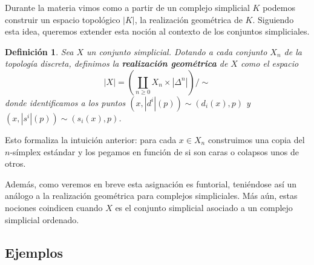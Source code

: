 \documentclass[11pt]{report}
\theoremstyle{colored}
\newtheorem{definition}{Definición}[section]
\renewcommand{\ss}[1]{\Delta^{#1}}
\begin{document}
Durante la materia vimos como a partir de un complejo simplicial $K$ podemos construir un espacio topológico $|K|$, la realización geométrica de $K$. Siguiendo esta idea, queremos extender esta noción al contexto de los conjuntos simpliciales.

\begin{definition} Sea $X$ un conjunto simplicial. Dotando a cada conjunto $X_n$ de la topología discreta, definimos la \textbf{realización geométrica} de $X$ como el espacio
\[
|X| = \left(\coprod_{n \geq 0}X_n \times |\ss{n}|\right)\Big/\sim
\]
donde identificamos a los puntos $(x,|d^i|(p)) \sim (d_i(x),p)$ y $(x,|s^i|(p)) \sim (s_i(x),p)$.
\end{definition}

Esto formaliza la intuición anterior: para cada $x \in X_n$ construimos una copia del $n$-símplex estándar y los pegamos en función de si son caras o colapsos unos de otros.

Además, como veremos en breve esta asignación es funtorial, teniéndose así un análogo a la realización geométrica para complejos simpliciales. Más aún, estas nociones coindicen cuando $X$ es el conjunto simplicial asociado a un complejo simplicial ordenado.

\subsection{Ejemplos}
\end{document}

